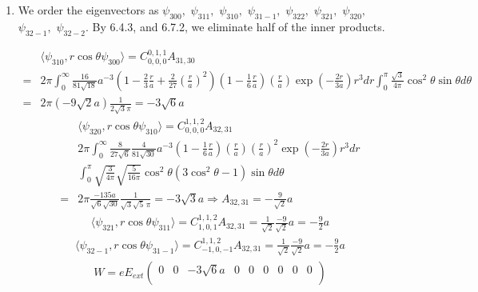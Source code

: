 \begin{enumerate}
    \item We order the eigenvectors as $\psi_{300},$ $\psi_{311},$ $\psi_{310},$ $\psi_{31-1},$ $\psi_{322},$ $\psi_{321},$ $\psi_{320},$ $\psi_{32-1},$ $\psi_{32-2}.$ By 6.4.3, and 6.7.2, we eliminate half of the inner products.

    \begin{align*}
        &\langle\psi_{310}, r\cos\theta\psi_{300}\rangle  = 
        C^{0,1,1}_{0,0,0}A_{31,30}\\
        =&
        2\pi\int_0^\infty
        \frac{16}{81\sqrt{18}}
        a^{-3}\left( 1-\frac{2}{3}\frac{r}{a}+\frac{2}{27}\left(\frac{r}{a}\right)^2
        \right)
        \left(1-\frac{1}{6}\frac{r}{a}\right)\left(\frac{r}{a}\right)
        \exp(-\frac{2r}{3a})r^3dr\int_0^\pi \frac{\sqrt{3}}{4\pi}\cos^2\theta\sin\theta d\theta\\
        =&2\pi(-9\sqrt{2}a)\frac{1}{2\sqrt{3}\pi} = -3\sqrt{6}a
    \end{align*}
    \begin{align*}
        &\langle\psi_{320}, r\cos\theta\psi_{310}\rangle  = 
        C^{1,1,2}_{0,0,0}A_{32,31}\\
        &2\pi\int_0^\infty 
        \frac{8}{27\sqrt{6}}\frac{4}{81\sqrt{30}}
        a^{-3}\left(1-
        \frac{1}{6}\frac{r}{a}
        \right)\left(\frac{r}{a}\right)
        \left(\frac{r}{a}\right)^2
        \exp(-\frac{2r}{3a})r^3dr\\
        &\int_0^\pi \sqrt{\frac{3}{4\pi}}\sqrt{\frac{5}{16\pi}}
        \cos^2\theta(3\cos^2\theta-1)\sin\theta d\theta \\
        =&2\pi \frac{-135a}{\sqrt{6} \sqrt{30}}\frac{1}{\sqrt{3} \sqrt{5} \, \pi}=-3\sqrt{3}a\Rightarrow A_{32,31}=-\frac{9}{\sqrt{2}}a
    \end{align*}
\begin{align*}
        \langle\psi_{321}, r\cos\theta\psi_{311}\rangle  = 
        C^{1,1,2}_{1,0,1}A_{32,31}=
        \frac{1}{\sqrt{2}}\frac{-9}{\sqrt{2}}a=-\frac{9}{2}a
    \end{align*}
    \begin{align*}
        \langle\psi_{32-1}, r\cos\theta\psi_{31-1}\rangle  = 
        C^{1,1,2}_{-1,0,-1}A_{32,31}=
        \frac{1}{\sqrt{2}}\frac{-9}{\sqrt{2}}a=-\frac{9}{2}a
    \end{align*}
    \begin{align*}
        W = eE_{ext}\begin{pmatrix}
            0 & 0 & -3\sqrt{6}a &0 &0 &0 &0 &0 &0 \\

\end{pmatrix}
\end{align*}
\end{enumerate}
